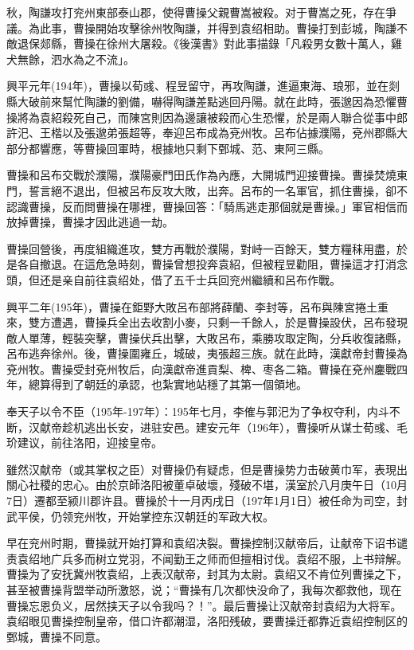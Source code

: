 秋，陶謙攻打兖州東部泰山郡，使得曹操父親曹嵩被殺。对于曹嵩之死，存在爭議。為此事，曹操開始攻擊徐州牧陶謙，并得到袁绍相助。曹操打到彭城，陶謙不敵退保郯縣，曹操在徐州大屠殺。《後漢書》對此事描錄「凡殺男女數十萬人，雞犬無餘，泗水為之不流」。

興平元年(194年)，曹操以荀彧、程昱留守，再攻陶謙，進逼東海、琅邪，並在剡縣大破前來幫忙陶謙的劉備，嚇得陶謙差點逃回丹陽。就在此時，張邈因為恐懼曹操將為袁紹殺死自己，而陳宮則因為邊讓被殺而心生恐懼，於是兩人聯合從事中郎許汜、王楷以及張邈弟張超等，奉迎呂布成為兗州牧。呂布佔據濮陽，兗州郡縣大部分都響應，等曹操回軍時，根據地只剩下鄄城、范、東阿三縣。

曹操和呂布交戰於濮陽，濮陽豪門田氏作為內應，大開城門迎接曹操。曹操焚燒東門，誓言絕不退出，但被呂布反攻大敗，出奔。呂布的一名軍官，抓住曹操，卻不認識曹操，反而問曹操在哪裡，曹操回答：「騎馬逃走那個就是曹操。」軍官相信而放掉曹操，曹操才因此逃過一劫。

曹操回營後，再度組織進攻，雙方再戰於濮陽，對峙一百餘天，雙方糧秣用盡，於是各自撤退。在這危急時刻，曹操曾想投奔袁紹，但被程昱勸阻，曹操這才打消念頭，但还是亲自前往袁绍处，借了五千士兵回兖州繼續和呂布作戰。

興平二年(195年)，曹操在鉅野大敗呂布部將薛蘭、李封等，呂布與陳宮捲土重來，雙方遭遇，曹操兵全出去收割小麥，只剩一千餘人，於是曹操設伏，呂布發現敵人單薄，輕裝突擊，曹操伏兵出擊，大敗呂布，乘勝攻取定陶，分兵收復諸縣，呂布逃奔徐州。後，曹操圍雍丘，城破，夷張超三族。就在此時，漢獻帝封曹操為兗州牧。曹操受封兗州牧后，向漢獻帝進貢梨、椑、枣各二箱。曹操在兗州鏖戰四年，總算得到了朝廷的承認，也紮實地站穩了其第一個領地。

奉天子以令不臣（195年-197年）：195年七月，李傕与郭汜为了争权夺利，内斗不断，汉献帝趁机逃出长安，进驻安邑。建安元年（196年），曹操听从谋士荀彧、毛玠建议，前往洛阳，迎接皇帝。

雖然汉献帝（或其掌权之臣）对曹操仍有疑虑，但是曹操势力击破黄巾军，表現出關心社稷的忠心。由於京師洛阳被董卓破壞，殘破不堪，漢室於八月庚午日（10月7日）遷都至颍川郡许县。曹操於十一月丙戌日（197年1月1日）被任命为司空，封武平侯，仍领兖州牧，开始掌控东汉朝廷的军政大权。

早在兖州时期，曹操就开始打算和袁绍决裂。曹操控制汉献帝后，让献帝下诏书谴责袁绍地广兵多而树立党羽，不闻勤王之师而但擅相讨伐。袁绍不服，上书辩解。曹操为了安抚冀州牧袁绍，上表汉献帝，封其为太尉。袁绍又不肯位列曹操之下，甚至被曹操背盟举动所激怒，说；“曹操有几次都快没命了，我每次都救他，现在曹操忘恩负义，居然挟天子以令我吗？！”。最后曹操让汉献帝封袁绍为大将军。袁绍眼见曹操控制皇帝，借口许都潮湿，洛阳残破，要曹操迁都靠近袁绍控制区的鄄城，曹操不同意。

